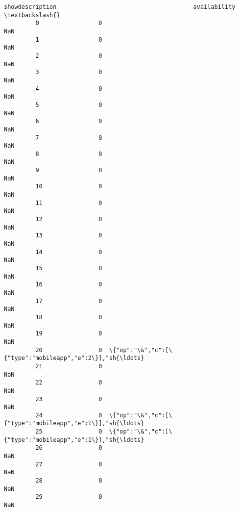 \documentclass[11pt]{article}
\begin{document}
\begin{Verbatim}[commandchars=\\\{\}]
             showdescription                                       availability  \textbackslash{}
         0                 0                                                NaN   
         1                 0                                                NaN   
         2                 0                                                NaN   
         3                 0                                                NaN   
         4                 0                                                NaN   
         5                 0                                                NaN   
         6                 0                                                NaN   
         7                 0                                                NaN   
         8                 0                                                NaN   
         9                 0                                                NaN   
         10                0                                                NaN   
         11                0                                                NaN   
         12                0                                                NaN   
         13                0                                                NaN   
         14                0                                                NaN   
         15                0                                                NaN   
         16                0                                                NaN   
         17                0                                                NaN   
         18                0                                                NaN   
         19                0                                                NaN   
         20                0  \{"op":"\&","c":[\{"type":"mobileapp","e":2\}],"sh{\ldots}   
         21                0                                                NaN   
         22                0                                                NaN   
         23                0                                                NaN   
         24                0  \{"op":"\&","c":[\{"type":"mobileapp","e":1\}],"sh{\ldots}   
         25                0  \{"op":"\&","c":[\{"type":"mobileapp","e":1\}],"sh{\ldots}   
         26                0                                                NaN   
         27                0                                                NaN   
         28                0                                                NaN   
         29                0                                                NaN   

\end{Verbatim}
\end{document}
